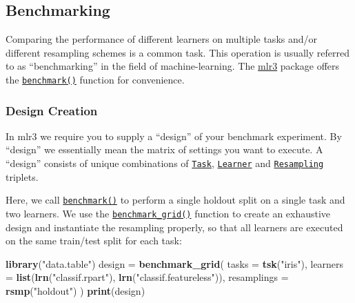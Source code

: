 \documentclass[]{article}
\newenvironment{Shaded}{\begin{snugshade}}{\end{snugshade}}
\newcommand{\DataTypeTok}[1]{\textcolor[rgb]{0.13,0.29,0.53}{#1}}
\newcommand{\KeywordTok}[1]{\textcolor[rgb]{0.13,0.29,0.53}{\textbf{#1}}}
\newcommand{\NormalTok}[1]{#1}
\newcommand{\StringTok}[1]{\textcolor[rgb]{0.31,0.60,0.02}{#1}}
\renewenvironment{Shaded} {\begin{snugshade}\small} {\end{snugshade}}
\begin{document}
\hypertarget{benchmarking}{%
\subsection{Benchmarking}\label{benchmarking}}

Comparing the performance of different learners on multiple tasks and/or different resampling schemes is a common task.
This operation is usually referred to as ``benchmarking'' in the field of machine-learning.
The \href{https://mlr3.mlr-org.com}{mlr3} package offers the \href{https://mlr3.mlr-org.com/reference/benchmark.html}{\texttt{benchmark()}} function for convenience.

\hypertarget{bm-design}{%
\subsubsection{Design Creation}\label{bm-design}}

In mlr3 we require you to supply a ``design'' of your benchmark experiment.
By ``design'' we essentially mean the matrix of settings you want to execute.
A ``design'' consists of unique combinations of \href{https://mlr3.mlr-org.com/reference/Task.html}{\texttt{Task}}, \href{https://mlr3.mlr-org.com/reference/Learner.html}{\texttt{Learner}} and \href{https://mlr3.mlr-org.com/reference/Resampling.html}{\texttt{Resampling}} triplets.

Here, we call \href{https://mlr3.mlr-org.com/reference/benchmark.html}{\texttt{benchmark()}} to perform a single holdout split on a single task and two learners.
We use the \href{https://mlr3.mlr-org.com/reference/benchmark_grid.html}{\texttt{benchmark\_grid()}} function to create an exhaustive design and instantiate the resampling properly, so that all learners are executed on the same train/test split for each task:

\begin{Shaded}
\begin{Highlighting}[]
\KeywordTok{library}\NormalTok{(}\StringTok{"data.table"}\NormalTok{)}
\NormalTok{design =}\StringTok{ }\KeywordTok{benchmark_grid}\NormalTok{(}
  \DataTypeTok{tasks =} \KeywordTok{tsk}\NormalTok{(}\StringTok{"iris"}\NormalTok{),}
  \DataTypeTok{learners =} \KeywordTok{list}\NormalTok{(}\KeywordTok{lrn}\NormalTok{(}\StringTok{"classif.rpart"}\NormalTok{), }\KeywordTok{lrn}\NormalTok{(}\StringTok{"classif.featureless"}\NormalTok{)),}
  \DataTypeTok{resamplings =} \KeywordTok{rsmp}\NormalTok{(}\StringTok{"holdout"}\NormalTok{)}
\NormalTok{)}
\KeywordTok{print}\NormalTok{(design)}
\end{Highlighting}
\end{Shaded}
\end{document}
